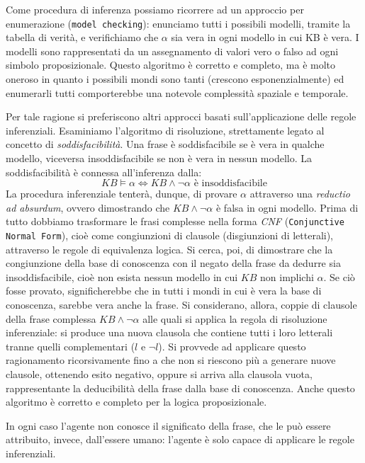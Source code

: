 		Come procedura di inferenza possiamo ricorrere ad un approccio per enumerazione (\texttt{model checking}): enunciamo tutti i possibili modelli, tramite la tabella di verità, e verifichiamo che $\alpha$ sia vera in ogni modello in cui KB è vera. I modelli sono rappresentati da un assegnamento di valori vero o falso ad ogni simbolo proposizionale. Questo algoritmo è corretto e completo, ma è molto oneroso in quanto i possibili mondi sono tanti (crescono esponenzialmente) ed enumerarli tutti comporterebbe una notevole complessità spaziale e temporale.
		\par
		Per tale ragione si preferiscono altri approcci basati sull'applicazione delle regole inferenziali. Esaminiamo l'algoritmo di risoluzione, strettamente legato al concetto di \emph{soddisfacibilità}. Una frase è soddisfacibile se è vera in qualche modello, viceversa insoddisfacibile se non è vera in nessun modello. La soddisfacibilità è connessa all'inferenza dalla:
		\begin{equation}
		KB\vDash\alpha \iff KB\wedge \neg \alpha \mbox{ è insoddisfacibile}
		\end{equation}
		La procedura inferenziale tenterà, dunque, di provare $\alpha$ attraverso una \emph{reductio ad absurdum}, ovvero dimostrando che $KB\wedge \neg \alpha$ è falsa in ogni modello. 
		Prima di tutto dobbiamo trasformare le frasi complesse nella forma \emph{CNF} (\texttt{Conjunctive Normal Form}), cioè come congiunzioni di clausole (disgiunzioni di letterali), attraverso le regole di equivalenza logica. %
		Si cerca, poi, di dimostrare che la congiunzione della base di conoscenza con il negato della frase da dedurre sia insoddisfacibile, cioè non esista nessun modello in cui $KB$ non implichi $\alpha$. Se ciò fosse provato, significherebbe che in tutti i mondi in cui è vera la base di conoscenza, sarebbe vera anche la frase. Si considerano, allora, coppie di clausole della frase complessa $KB\wedge \neg \alpha$ alle quali si applica la regola di risoluzione inferenziale: si produce una nuova clausola che contiene tutti i loro letterali tranne quelli complementari ($l$ e $\neg l$). Si provvede ad 
		applicare questo ragionamento ricorsivamente fino a che non si riescono più a generare nuove clausole, ottenendo esito negativo, oppure si arriva alla clausola vuota, rappresentante la deducibilità della frase dalla base di conoscenza. Anche questo algoritmo è corretto e completo per la logica proposizionale.\par
		In ogni caso l'agente non conosce il significato della frase, che le può essere attribuito, invece, dall'essere umano: l'agente è solo capace di applicare le regole inferenziali.
		
